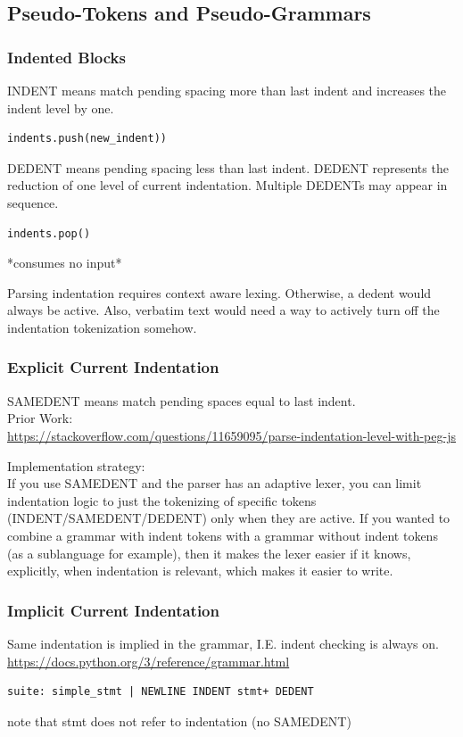 \documentclass{book}
\begin{document}
\subsection{Pseudo-Tokens and Pseudo-Grammars}

\subsubsection{Indented Blocks}
INDENT means match pending spacing more than last indent
and increases the indent level by one.
\begin{verbatim}
indents.push(new_indent))
\end{verbatim}

DEDENT means pending spacing less than last indent.
DEDENT represents the reduction of one 
level of current indentation. Multiple DEDENTs
may appear in sequence.
\begin{verbatim}
indents.pop()
\end{verbatim}
*consumes no input*

Parsing indentation requires context aware lexing.
Otherwise, a dedent would always be active.
Also, verbatim text would need a way to actively turn
off the indentation tokenization somehow.

\subsubsection{Explicit Current Indentation}
SAMEDENT means match pending spaces equal to last indent.\\
Prior Work:\\
\url{https://stackoverflow.com/questions/11659095/parse-indentation-level-with-peg-js}

Implementation strategy:\\
If you use SAMEDENT and the parser has an adaptive lexer, 
you can limit indentation logic to just the tokenizing
of specific tokens (INDENT/SAMEDENT/DEDENT) only when they
are active. If you wanted to combine a grammar with
indent tokens with a grammar without indent tokens
(as a sublanguage for example), then it makes the lexer
easier if it knows, explicitly, when indentation is relevant,
which makes it easier to write.

\subsubsection{Implicit Current Indentation}
Same indentation is implied in the grammar, 
I.E. indent checking is always on.
\url{https://docs.python.org/3/reference/grammar.html}
\begin{verbatim}
suite: simple_stmt | NEWLINE INDENT stmt+ DEDENT
\end{verbatim}
note that stmt does not refer to indentation (no SAMEDENT)
\end{document}

